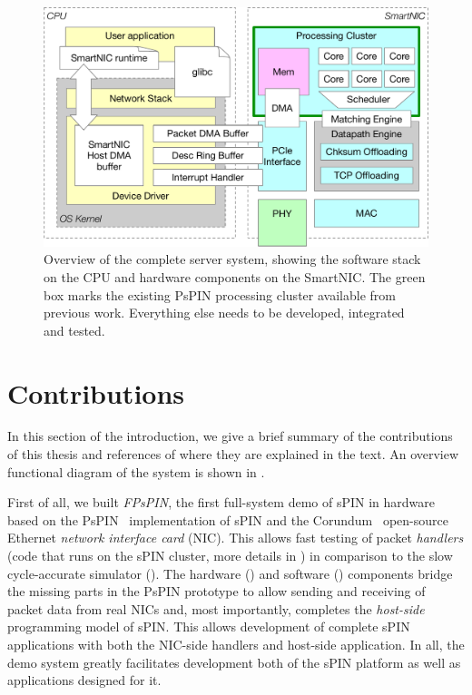 \begin{figure}
    \centering
    \includegraphics[width=.9\linewidth]{figures/system-overview.pdf}
    \caption{Overview of the complete server system, showing the software stack on the CPU and hardware components on the SmartNIC.  The green box marks the existing PsPIN processing cluster available from previous work.  Everything else needs to be developed, integrated and tested.}
    \label{fig:full-system}
\end{figure}

\section{Contributions} \label{sec:contributions}

In this section of the introduction, we give a brief summary of the contributions of this thesis and references of where they are explained in the text.  An overview functional diagram of the system is shown in .

First of all, we built \emph{FPsPIN}, the first full-system demo of sPIN in hardware based on the PsPIN~\cite{di_girolamo_pspin_2021} implementation of sPIN and the Corundum~\cite{forencich_corundum_2020} open-source Ethernet \emph{network interface card} (NIC).  This allows fast testing of packet \emph{handlers} (code that runs on the sPIN cluster, more details in ) in comparison to the slow cycle-accurate simulator ().  The hardware () and software () components bridge the missing parts in the PsPIN prototype to allow sending and receiving of packet data from real NICs and, most importantly, completes the \emph{host-side} programming model of sPIN.  This allows development of complete sPIN applications with both the NIC-side handlers and host-side application.  In all, the demo system greatly facilitates development both of the sPIN platform as well as applications designed for it.

